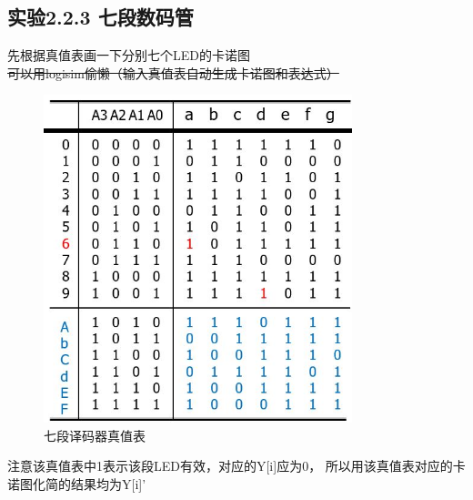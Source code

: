 \documentclass[12pt,a4paper,UTF8]{article}
\begin{document}
\subsection{实验2.2.3 七段数码管}
先根据真值表画一下分别七个LED的卡诺图 \\
\hspace*{2em}\sout{可以用logisim偷懒（输入真值表自动生成卡诺图和表达式）} \\
\begin{figure}[H]
  \centering
  \includegraphics[width=0.8\textwidth]{truth_table_7seg.JPG}
  \caption{七段译码器真值表}
  \label{truth_table_7seg}
\end{figure}

注意该真值表中1表示该段LED有效，对应的Y[i]应为0，
所以用该真值表对应的卡诺图化简的结果均为Y[i]' \\
\end{document}

